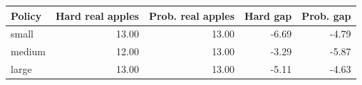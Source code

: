 \begin{tabular}{lrrrr}
\toprule
Policy & Hard real apples & Prob. real apples & Hard gap & Prob. gap \\
\midrule
small & 13.00 & 13.00 & -6.69 & -4.79 \\
medium & 12.00 & 13.00 & -3.29 & -5.87 \\
large & 13.00 & 13.00 & -5.11 & -4.63 \\
\bottomrule
\end{tabular}

